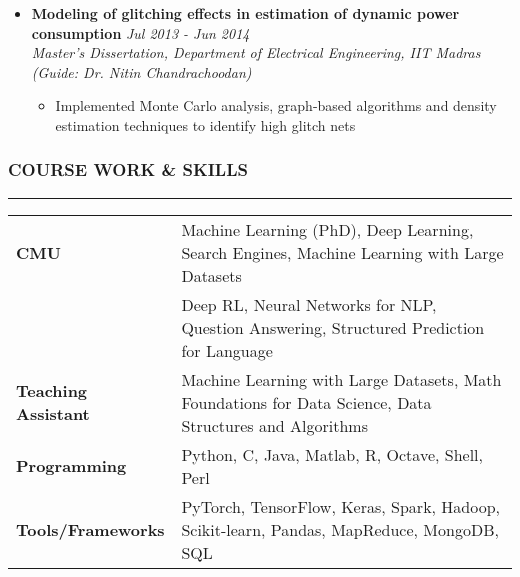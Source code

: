 \documentclass[10pt,a4paper,English]{article}
\newcommand\roottitle[1]{\vspace{-4mm}\subsubsection*{\uppercase{#1}}\vspace{-0.3em}\nopagebreak[4]\hrule\vspace{4mm}}
\newcommand\itemyear[1]{\hfill \emph{\color{itemyear} #1}}
\newcommand\itemenv{\setlength\itemsep{0.5pt} \addtolength{\itemindent}{-5mm}\vspace{-1.5mm}}
\begin{document}
\begin{itemize}
    \item \textbf{Modeling of glitching effects in estimation of dynamic power consumption} \itemyear{Jul 2013 - Jun 2014} \\
    \emph{Master's Dissertation, Department of Electrical Engineering, IIT Madras (Guide: Dr. Nitin Chandrachoodan)}
        \begin{itemize} \itemenv
            \item Implemented Monte Carlo analysis, graph-based algorithms and density estimation techniques to identify high glitch nets
        \end{itemize}
\end{itemize}

\roottitle{Course Work \& Skills}
\vspace{-2mm}
\renewcommand{\arraystretch}{1.2}
\setlength\tabcolsep{0pt}
\begin{tabularx}{\textwidth}{ l @{ - } X }
\textbf{CMU}                        & Machine Learning (PhD), Deep Learning, Search Engines, Machine Learning with Large Datasets \\
                                    & Deep RL, Neural Networks for NLP, Question Answering, Structured Prediction for Language \\
\textbf{Teaching Assistant}         & Machine Learning with Large Datasets, Math Foundations for Data Science, Data Structures and Algorithms \\
\textbf{Programming}                & Python, C, Java, Matlab, R, Octave, Shell, Perl \\
\textbf{Tools/Frameworks}           & PyTorch, TensorFlow, Keras, Spark, Hadoop, Scikit-learn, Pandas, MapReduce, MongoDB, SQL \\
\end{tabularx}
\vspace{2mm}
\end{document}
